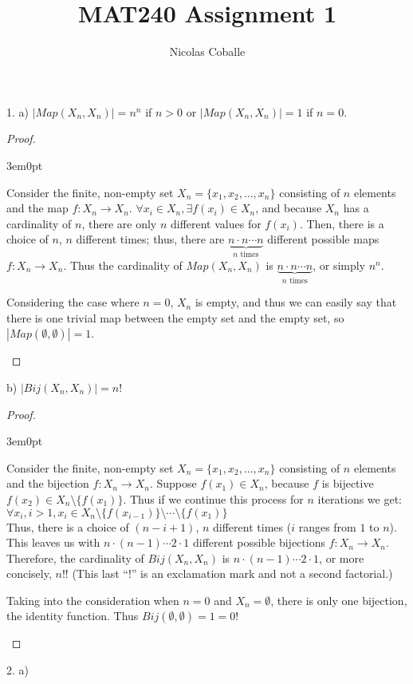 \documentclass[11pt]{article}
\title{MAT240 Assignment 1}
\author{Nicolas Coballe}
\newcommand{\bproof}{\begin{proof}
$ $ \\
\begin{adjustwidth}{3em}{0pt}
}
\newcommand{\eproof}{\end{adjustwidth}
\end{proof}}
\begin{document}
\maketitle
\begin{flushleft}

1. a) $|Map(X_n, X_n)| = n^n$ if $n > 0$ or $|Map(X_n, X_n)| = 1$ if $n=0$.

\bproof

Consider the finite, non-empty set $X_n = \{ x_1, x_2, ..., x_n \}$ consisting of $n$ elements and the map $f: X_n \rightarrow X_n$. 
$\forall x_i \in X_n, \exists f(x_i) \in X_n $, and because $X_n$ has a cardinality of $n$, there are only
$n$ different values for $f(x_i)$. Then, there is a choice of $n$, $n$ different times; thus, there are $\underbrace{n \cdot n \cdots n }_\text{$n$ times}$ different possible maps $f: X_n \rightarrow X_n$. Thus the cardinality of $Map(X_n, X_n)$ is $\underbrace{n \cdot n \cdots n }_\text{$n$ times}$, or simply $n^n$.

Considering the case where $n = 0$, $X_n$ is empty, and thus we can easily say that there is one trivial map between the empty set and the empty set, so $|Map(\emptyset , \emptyset )| = 1$.

\eproof

b) $|Bij(X_n, X_n)| = n!$

\bproof

Consider the finite, non-empty set $X_n = \{ x_1, x_2, ..., x_n \}$ consisting of $n$ elements and the bijection $f: X_n \rightarrow X_n$. Suppose $f(x_1) \in X_n$, because $f$ is bijective $f(x_2) \in X_n \setminus \{ f(x_1) \} $. Thus if we continue this process for $n$ iterations we get: $\forall x_i, i>1, x_i \in X_n \setminus \{ f(x_{i-1}) \} \setminus \cdots \setminus \{ f(x_1) \}$ \\
Thus, there is a choice of $(n-i+1)$, $n$ different times ($i$ ranges from $1$ to $n$). This leaves us with $n \cdot (n-1) \cdots 2 \cdot 1$ different possible bijections $f: X_n \rightarrow X_n$. Therefore, the cardinality of $Bij(X_n, X_n)$ is $n \cdot (n-1) \cdots 2 \cdot 1$, or more concisely, $n!$! (This last ``!'' is an exclamation mark and not a second factorial.)

\bigskip
Taking into the consideration when $n = 0$ and $X_n = \emptyset$, there is only one bijection, the identity function. Thus  $Bij(\emptyset , \emptyset ) = 1 = 0!$

\eproof

\newpage

2. a)


\end{flushleft}
\end{document}
